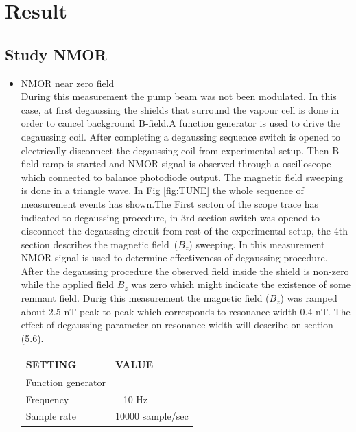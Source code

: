 \chapter{Result\label{ch:results}}


\section{Study NMOR }
   \begin{itemize}
     \item NMOR near zero field \\
 During this measurement the pump beam was not been modulated. In this case,  at first degaussing the shields that surround the vapour cell is done in order to cancel background B-field.A function generator is used to drive the degaussing coil. After completing a degaussing sequence switch is opened to electrically disconnect the degaussing coil from experimental setup. Then B-field ramp is started and NMOR signal is observed through a oscilloscope which  connected to balance photodiode output. The magnetic field sweeping is done in a triangle wave. In Fig \ref{fig:TUNE} the whole sequence of measurement events has shown.The First secton of the scope trace has indicated to degaussing procedure, in 3rd section  switch was opened to disconnect the degaussing circuit from rest of the experimental setup, the 4th section describes the magnetic field~($B_z$) sweeping. 
In this measurement NMOR signal is used to determine effectiveness of degaussing procedure. After the degaussing procedure the observed field inside the shield is non-zero while the applied field $B_z$ was zero which might indicate the existence of some remnant field. Durig this measurement the magnetic field ($B_z$) was ramped about 2.5 nT peak to peak which corresponds to resonance width 0.4 nT. The effect of degaussing parameter on resonance width will describe on section (5.6).
\begin{table}[h]
\centering
\begin{tabular}{|l |l|}
\hline

\textbf{ SETTING}    & \textbf{VALUE} \\
\hline
Function generator &   \\
\hline
Frequency & ~ 10 Hz   \\

Sample rate    &  10000 sample/sec  \\


\end{tabular}
\end{table}
\end{itemize}

